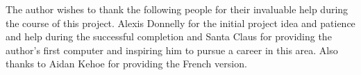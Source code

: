 \begin{acknowledgements}

The author wishes to thank the following people for their invaluable help
during the course of this project. Alexis Donnelly for the initial project idea
and patience and help during the successful completion and Santa Claus for
providing the author's first computer and inspiring him to pursue a career
in this area. Also thanks to Aidan Kehoe for providing the French version.

\end{acknowledgements}
